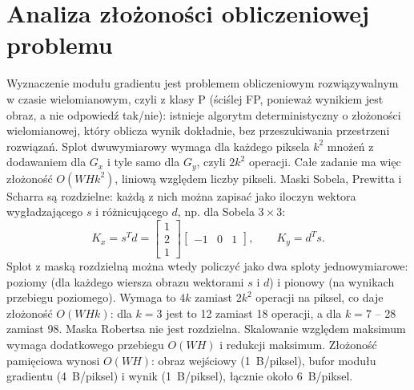 \documentclass[12pt,a4paper]{article}
\begin{document}
\section{Analiza złożoności obliczeniowej problemu}

Wyznaczenie modułu gradientu jest problemem obliczeniowym rozwiązywalnym w czasie wielomianowym, czyli z klasy P (ściślej FP, ponieważ wynikiem jest obraz, a nie odpowiedź tak/nie): istnieje algorytm deterministyczny o złożoności wielomianowej, który oblicza wynik dokładnie, bez przeszukiwania przestrzeni rozwiązań. Splot dwuwymiarowy wymaga dla każdego piksela $k^2$ mnożeń z dodawaniem dla $G_x$ i tyle samo dla $G_y$, czyli $2k^2$ operacji. Całe zadanie ma więc złożoność $O(W H k^{2})$, liniową względem liczby pikseli. Maski Sobela, Prewitta i Scharra są rozdzielne: każdą z nich można zapisać jako iloczyn wektora wygładzającego $s$ i różnicującego $d$, np. dla Sobela $3\times3$:
\begin{equation}
	K_x = s^{T} d = \begin{bmatrix} 1 \\ 2 \\ 1 \end{bmatrix} \begin{bmatrix} -1 & 0 & 1 \end{bmatrix},
	\qquad K_y = d^{T} s.
\end{equation}
Splot z maską rozdzielną można wtedy policzyć jako dwa sploty jednowymiarowe: poziomy (dla każdego wiersza obrazu wektorami $s$ i $d$) i pionowy (na wynikach przebiegu poziomego). Wymaga to $4k$ zamiast $2k^2$ operacji na piksel, co daje złożoność $O(W H k)$: dla $k = 3$ jest to 12 zamiast 18 operacji, a dla $k = 7$ -- 28 zamiast 98. Maska Robertsa nie jest rozdzielna. Skalowanie względem maksimum wymaga dodatkowego przebiegu $O(W H)$ i redukcji maksimum. Złożoność pamięciowa wynosi $O(W H)$: obraz wejściowy (1~B/piksel), bufor modułu gradientu (4~B/piksel) i wynik (1~B/piksel), łącznie około 6~B/piksel.
\end{document}
